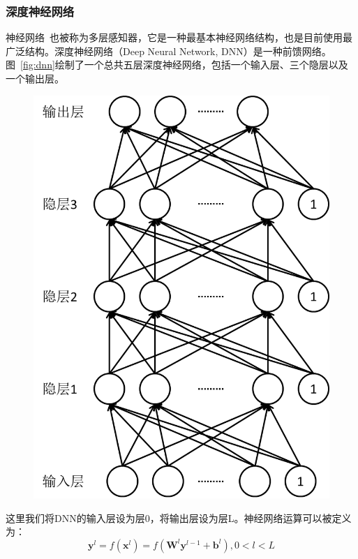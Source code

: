 \subsubsection{深度神经网络}
神经网络~\cite{rumelhart1986learning}也被称为多层感知器，它是一种最基本神经网络结构，也是目前使用最广泛结构。深度神经网络（Deep Neural Network, DNN）是一种前馈网络。图~\ref{fig:dnn}绘制了一个总共五层深度神经网络，包括一个输入层、三个隐层以及一个输出层。
\begin{figure}[!htp]
  \centering
    \captionstyle{\centering}
    \includegraphics[height=.4\textheight]{figure/dnn.png}
\end{figure}
这里我们将DNN的输入层设为层0，将输出层设为层L。神经网络运算可以被定义为：
\begin{equation}
    \mathbf{y}^l=f(\mathbf{x}^l)=f(\mathbf{W}^l\mathbf{y}^{l-1}+\mathbf{b}^l), 0 < l < L
\end{equation}

